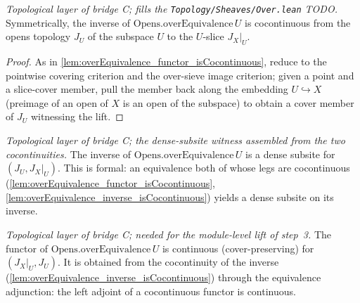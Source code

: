 \begin{lemma}
  \label{lem:overEquivalence_inverse_isCocontinuous}
  \textit{Topological layer of bridge C; fills the \texttt{Topology/Sheaves/Over.lean} TODO.}
  Symmetrically, the inverse of \(\mathrm{Opens.overEquivalence}\,U\) is cocontinuous from the
  opens topology \(J_U\) of the subspace \(U\) to the \(U\)-slice \(J_X|_U\).
\end{lemma}
\begin{proof}
  As in \cref{lem:overEquivalence_functor_isCocontinuous}, reduce to the pointwise covering
  criterion and the over-sieve image criterion; given a point and a slice-cover member, pull the
  member back along the embedding \(U \hookrightarrow X\) (preimage of an open of \(X\) is an open
  of the subspace) to obtain a cover member of \(J_U\) witnessing the lift.
\end{proof}

\begin{lemma}
  \label{lem:overEquivalence_inverse_isDenseSubsite}
  \textit{Topological layer of bridge C; the dense-subsite witness assembled from the two
  cocontinuities.}
  The inverse of \(\mathrm{Opens.overEquivalence}\,U\) is a dense subsite for \((J_U, J_X|_U)\).
  This is formal: an equivalence both of whose legs are cocontinuous
  (\cref{lem:overEquivalence_functor_isCocontinuous},
  \cref{lem:overEquivalence_inverse_isCocontinuous}) yields a dense subsite on its inverse.
\end{lemma}

\begin{lemma}
  \label{lem:overEquivalence_functor_isContinuous}
  \textit{Topological layer of bridge C; needed for the module-level lift of step~3.}
  The functor of \(\mathrm{Opens.overEquivalence}\,U\) is continuous (cover-preserving) for
  \((J_X|_U, J_U)\). It is obtained from the cocontinuity of the inverse
  (\cref{lem:overEquivalence_inverse_isCocontinuous}) through the equivalence adjunction: the
  left adjoint of a cocontinuous functor is continuous.
\end{lemma}

